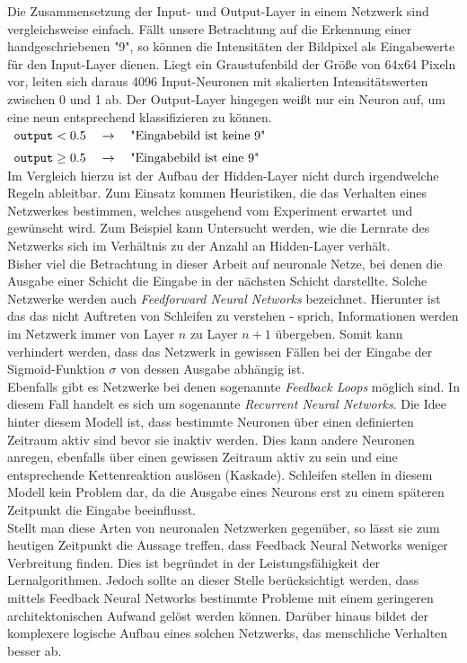 \noindent
Die Zusammensetzung der Input- und Output-Layer in einem Netzwerk sind vergleichsweise einfach. Fällt unsere Betrachtung auf die Erkennung einer handgeschriebenen "9", so können die Intensitäten der Bildpixel als Eingabewerte für den Input-Layer dienen. Liegt ein Graustufenbild der Größe von 64x64 Pixeln vor, leiten sich daraus 4096 Input-Neuronen  mit skalierten Intensitätswerten zwischen 0 und 1 ab. Der Output-Layer hingegen weißt nur ein Neuron auf, um eine neun entsprechend klassifizieren zu können. \\[0.2cm]
\hspace*{1.3cm}
$ 
\begin{array}[t]{lcll}
	\mathtt{output} < 0.5 \quad\rightarrow\quad \mbox{"Eingabebild ist keine 9"} \\[0.2cm]
	\mathtt{output} \geq 0.5 \quad\rightarrow\quad \mbox{"Eingabebild ist eine 9"}
\end{array}
$
\\[0.2cm]
Im Vergleich hierzu ist der Aufbau der Hidden-Layer nicht durch irgendwelche Regeln ableitbar. Zum Einsatz kommen Heuristiken, die das Verhalten eines Netzwerkes bestimmen, welches ausgehend vom Experiment erwartet und gewünscht wird. Zum Beispiel kann Untersucht werden, wie die Lernrate des Netzwerks sich im Verhältnis zu der Anzahl an Hidden-Layer verhält. \\

\noindent
Bisher viel die Betrachtung in dieser Arbeit auf neuronale Netze, bei denen die Ausgabe einer Schicht die Eingabe in der nächsten Schicht darstellte. Solche Netzwerke werden auch \textit{Feedforward Neural Networks} bezeichnet. Hierunter ist das das nicht Auftreten von Schleifen zu verstehen - sprich, Informationen werden im Netzwerk immer von Layer $n$ zu Layer $n+1$ übergeben. Somit kann verhindert werden, dass das Netzwerk in gewissen Fällen bei der Eingabe der Sigmoid-Funktion $\sigma$ von dessen Ausgabe abhängig ist. \\
Ebenfalls gibt es Netzwerke bei denen sogenannte \textit{Feedback Loops} möglich sind. In diesem Fall handelt es sich um sogenannte \textit{Recurrent Neural Networks}. Die Idee hinter diesem Modell ist, dass bestimmte Neuronen über einen definierten Zeitraum aktiv sind bevor sie inaktiv werden. Dies kann andere Neuronen anregen, ebenfalls über einen gewissen Zeitraum aktiv zu sein und eine entsprechende Kettenreaktion auslösen (Kaskade). Schleifen stellen in diesem Modell kein Problem dar, da die Ausgabe eines Neurons erst zu einem späteren Zeitpunkt die Eingabe beeinflusst. \\
Stellt man diese Arten von neuronalen Netzwerken gegenüber, so lässt sie zum heutigen Zeitpunkt die Aussage treffen, dass Feedback Neural Networks weniger Verbreitung finden. Dies ist begründet in der Leistungsfähigkeit der Lernalgorithmen. Jedoch sollte an dieser Stelle berücksichtigt werden, dass mittels Feedback Neural Networks bestimmte Probleme mit einem geringeren architektonischen Aufwand gelöst werden können. Darüber hinaus bildet der komplexere logische Aufbau eines solchen Netzwerks, das menschliche Verhalten besser ab.


